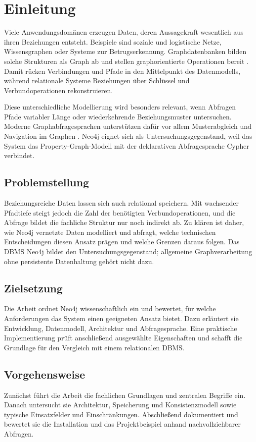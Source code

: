
\chapter{Einleitung}

Viele Anwendungsdomänen erzeugen Daten, deren Aussagekraft wesentlich aus ihren Beziehungen entsteht. Beispiele sind soziale und logistische Netze, Wissensgraphen oder Systeme zur Betrugserkennung. Graphdatenbanken bilden solche Strukturen als Graph ab und stellen graphorientierte Operationen bereit \cite{angles2008survey}. Damit rücken Verbindungen und Pfade in den Mittelpunkt des Datenmodells, während relationale Systeme Beziehungen über Schlüssel und Verbundoperationen rekonstruieren.

Diese unterschiedliche Modellierung wird besonders relevant, wenn Abfragen Pfade variabler Länge oder wiederkehrende Beziehungsmuster untersuchen. Moderne Graphabfragesprachen unterstützen dafür vor allem Musterabgleich und Navigation im Graphen \cite{angles2017foundations}. Neo4j eignet sich als Untersuchungsgegenstand, weil das System das Property-Graph-Modell mit der deklarativen Abfragesprache Cypher verbindet.

\section{Problemstellung}

Beziehungsreiche Daten lassen sich auch relational speichern. Mit wachsender Pfadtiefe steigt jedoch die Zahl der benötigten Verbundoperationen, und die Abfrage bildet die fachliche Struktur nur noch indirekt ab. Zu klären ist daher, wie Neo4j vernetzte Daten modelliert und abfragt, welche technischen Entscheidungen diesen Ansatz prägen und welche Grenzen daraus folgen. Das \ac{DBMS} Neo4j bildet den Untersuchungsgegenstand; allgemeine Graphverarbeitung ohne persistente Datenhaltung gehört nicht dazu.

\section{Zielsetzung}

Die Arbeit ordnet Neo4j wissenschaftlich ein und bewertet, für welche Anforderungen das System einen geeigneten Ansatz bietet. Dazu erläutert sie Entwicklung, Datenmodell, Architektur und Abfragesprache. Eine praktische Implementierung prüft anschließend ausgewählte Eigenschaften und schafft die Grundlage für den Vergleich mit einem relationalen \ac{DBMS}.

\section{Vorgehensweise}

Zunächst führt die Arbeit die fachlichen Grundlagen und zentralen Begriffe ein. Danach untersucht sie Architektur, Speicherung und Konsistenzmodell sowie typische Einsatzfelder und Einschränkungen. Abschließend dokumentiert und bewertet sie die Installation und das Projektbeispiel anhand nachvollziehbarer Abfragen.
